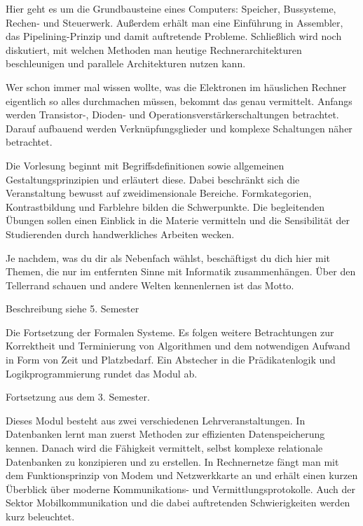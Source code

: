 Hier geht es um die Grundbausteine eines Computers:
Speicher, Bussysteme, Rechen- und Steuerwerk.
Außerdem erhält man eine Einführung in Assembler, das Pipelining-Prinzip und damit auftretende Probleme.
Schließlich wird noch diskutiert, mit welchen Methoden man heutige Rechnerarchitekturen beschleunigen und parallele Architekturen nutzen kann.

Wer schon immer mal wissen wollte, was die Elektronen im häuslichen Rechner eigentlich so alles durchmachen müssen, bekommt das genau vermittelt.
Anfangs werden Transistor-, Dioden- und Operationsverstärkerschaltungen betrachtet.
Darauf aufbauend werden Verknüpfungsglieder und komplexe Schaltungen näher betrachtet.

Die Vorlesung beginnt mit Begriffsdefinitionen sowie allgemeinen Gestaltungsprinzipien und erläutert diese.
Dabei beschränkt sich die Veranstaltung bewusst auf zweidimensionale Bereiche.
Formkategorien, Kontrastbildung und Farblehre bilden die Schwerpunkte.
Die begleitenden Übungen sollen einen Einblick in die Materie vermitteln und die Sensibilität der Studierenden durch handwerkliches Arbeiten wecken.

Je nachdem, was du dir als Nebenfach wählst, beschäftigst du dich hier mit Themen, die nur im entfernten Sinne mit Informatik zusammenhängen.
Über den Tellerrand schauen und andere Welten kennenlernen ist das Motto.

Beschreibung siehe 5. Semester


Die Fortsetzung der Formalen Systeme.
Es folgen weitere Betrachtungen zur Korrektheit und Terminierung von Algorithmen und dem notwendigen Aufwand in Form von Zeit und Platzbedarf.
Ein Abstecher in die Prädikatenlogik und Logikprogrammierung rundet das Modul ab.

Fortsetzung aus dem 3. Semester.

Dieses Modul besteht aus zwei verschiedenen Lehrveranstaltungen.
In Datenbanken lernt man zuerst Methoden zur effizienten Datenspeicherung kennen.
Danach wird die Fähigkeit vermittelt, selbst komplexe relationale Datenbanken zu konzipieren und zu erstellen.
In Rechnernetze fängt man mit dem Funktionsprinzip von Modem und Netzwerkkarte an und erhält einen kurzen Überblick über moderne Kommunikations- und Vermittlungsprotokolle.
Auch der Sektor Mobilkommunikation und die dabei auftretenden Schwierigkeiten werden kurz beleuchtet.

